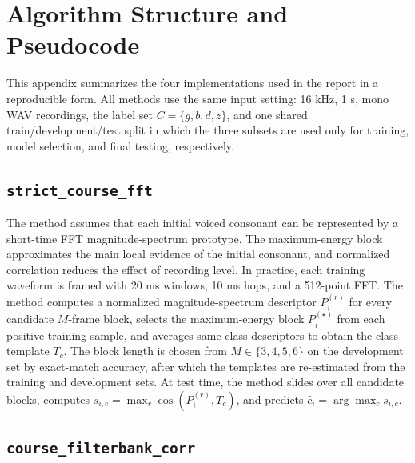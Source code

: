 \section{Algorithm Structure and Pseudocode}

This appendix summarizes the four implementations used in the report in a reproducible form. All methods use the same input setting: 16 kHz, 1 s, mono WAV recordings, the label set $C=\{g,b,d,z\}$, and one shared train/development/test split in which the three subsets are used only for training, model selection, and final testing, respectively.

\subsection{\texttt{strict\_course\_fft}}
\label{alg:strict-course}

The method assumes that each initial voiced consonant can be represented by a short-time FFT magnitude-spectrum prototype. The maximum-energy block approximates the main local evidence of the initial consonant, and normalized correlation reduces the effect of recording level. In practice, each training waveform is framed with 20 ms windows, 10 ms hops, and a 512-point FFT. The method computes a normalized magnitude-spectrum descriptor $P_i^{(r)}$ for every candidate $M$-frame block, selects the maximum-energy block $P_i^{(\star)}$ from each positive training sample, and averages same-class descriptors to obtain the class template $T_c$. The block length is chosen from $M\in\{3,4,5,6\}$ on the development set by exact-match accuracy, after which the templates are re-estimated from the training and development sets. At test time, the method slides over all candidate blocks, computes $s_{i,c}=\max_r\cos(P_i^{(r)},T_c)$, and predicts $\hat c_i=\arg\max_c s_{i,c}$.

\subsection{\texttt{course\_filterbank\_corr}}
\label{alg:course-filterbank}

